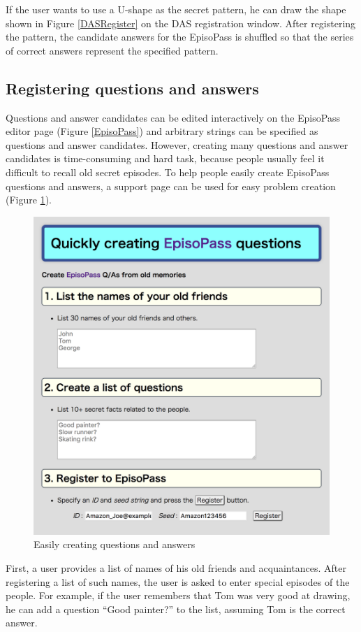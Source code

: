 \documentclass[sigconf]{acmart}
\begin{document}
If the user wants to use a U-shape as the secret pattern,
he can draw the shape shown in Figure \ref{DASRegister}
on the DAS registration window.
%
After registering the pattern, the candidate answers for the EpisoPass is
shuffled so that the series of correct answers represent the specified pattern.

\subsection{Registering questions and answers}
\label{easyregister}

Questions and answer candidates can be edited interactively on the
EpisoPass editor page (Figure \ref{EpisoPass}) and arbitrary
strings can be specified as questions and answer candidates.
However, creating many questions and answer candidates is
time-consuming and hard task, because
people usually feel it difficult to recall old secret episodes.
%
To help people easily create EpisoPass questions and answers,
a support page can be used for easy problem creation
(Figure \ref{Easy}).

\begin{figure}[H]
  \includegraphics[width=12cm,bb=0 0 1678 1728]{figures/Easy.png}
  \caption{Easily creating questions and answers}
  \label{Easy}
\end{figure}

First, a user provides a list of names of his old friends and acquaintances.
After registering a list of such names,
the user is asked to enter special episodes of the people.
For example, if the user remembers that Tom was
very good at drawing, he can add a question
``Good painter?'' to the list, assuming Tom is the correct answer.
\end{document}
